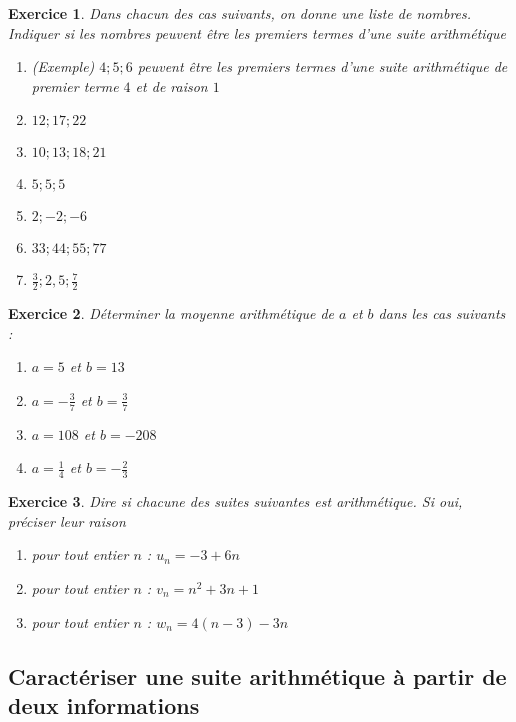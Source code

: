 \documentclass[10pt,a4paper]{article}
\newtheorem{exo}{Exercice}
\begin{document}
\newcommand{\insertph}[1]{%
 \tikz[remember picture] \node[inner sep=0pt,minimum height=10pt](#1){};} 


\vspace {10 mm}
\begin{exo}
    Dans chacun des cas suivants, on donne une liste de nombres. Indiquer si les nombres peuvent être les premiers termes d'une suite arithmétique
    \begin{enumerate}
        \item (Exemple) $4;5;6$ peuvent être les premiers termes d'une suite arithmétique de premier terme $4$ et de raison $1$    
        \item   $12;17;22$
        \item   $10;13;18;21$
        \item   $5;5;5$
        \item   $2; -2; -6$
        \item   $33;44;55;77$
        \item  $\frac{3}{2};2{,}5; \frac{7}{2}$
    \end{enumerate}
\end{exo}


\begin{exo}
    Déterminer la moyenne arithmétique de $a$ et $b$ dans les cas suivants :
    \begin{enumerate}
        \item $a=5$ et $b=13$
        \item $a=-\frac{3}{7}$ et $b=\frac{3}{7}$
        \item $a=108$ et $b=-208$
        \item $a=\frac{1}{4}$ et $b=-\frac{2}{3}$
    \end{enumerate}
\end{exo}

\begin{exo}
    Dire si chacune des suites suivantes est arithmétique. Si oui, préciser leur raison
        \begin{enumerate}
            \item pour tout entier $n$ : $u_n = -3+6n$
            \item pour tout entier $n$ : $v_n = n^2 + 3n + 1$
            \item pour tout entier $n$ : $w_n = 4(n-3) - 3n$
        \end{enumerate}
\end{exo}



\subsection{Caractériser une suite arithmétique à partir de deux informations}
\end{document}
